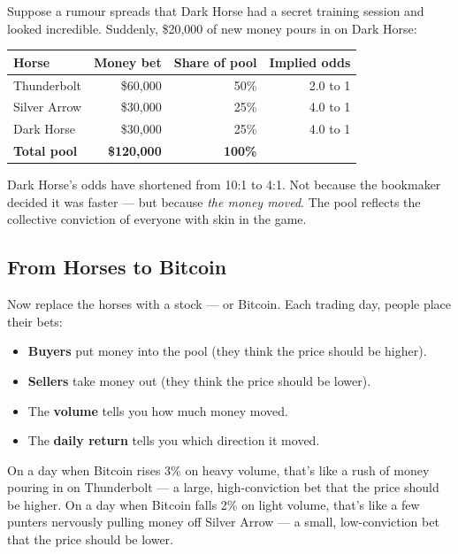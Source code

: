 \documentclass[11pt,a4paper]{article}
\begin{document}
Suppose a rumour spreads that Dark Horse had a secret training session
and looked incredible. Suddenly, \$20,000 of new money pours in on
Dark Horse:

\vspace{0.5em}
\begin{tabular}{@{}lrrr@{}}
    \toprule
    \textbf{Horse} & \textbf{Money bet} & \textbf{Share of pool}
        & \textbf{Implied odds} \\
    \midrule
    Thunderbolt  & \$60,000 & 50\% & 2.0 to 1 \\
    Silver Arrow & \$30,000 & 25\% & 4.0 to 1 \\
    Dark Horse   & \$30,000 & 25\% & 4.0 to 1 \\
    \midrule
    \textbf{Total pool} & \textbf{\$120,000} & \textbf{100\%} & \\
    \bottomrule
\end{tabular}

\vspace{0.5em}
Dark Horse's odds have shortened from 10:1 to 4:1. Not because the
bookmaker decided it was faster --- but because \emph{the money moved}.
The pool reflects the collective conviction of everyone with skin in
the game.

\subsection{From Horses to Bitcoin}

Now replace the horses with a stock --- or Bitcoin. Each trading day,
people place their bets:

\begin{itemize}[leftmargin=2em]
    \item \textbf{Buyers} put money into the pool (they think the price
          should be higher).
    \item \textbf{Sellers} take money out (they think the price should
          be lower).
    \item The \textbf{volume} tells you how much money moved.
    \item The \textbf{daily return} tells you which direction it moved.
\end{itemize}

On a day when Bitcoin rises 3\% on heavy volume, that's like a rush
of money pouring in on Thunderbolt --- a large, high-conviction bet
that the price should be higher. On a day when Bitcoin falls 2\% on
light volume, that's like a few punters nervously pulling money off
Silver Arrow --- a small, low-conviction bet that the price should
be lower.
\end{document}
